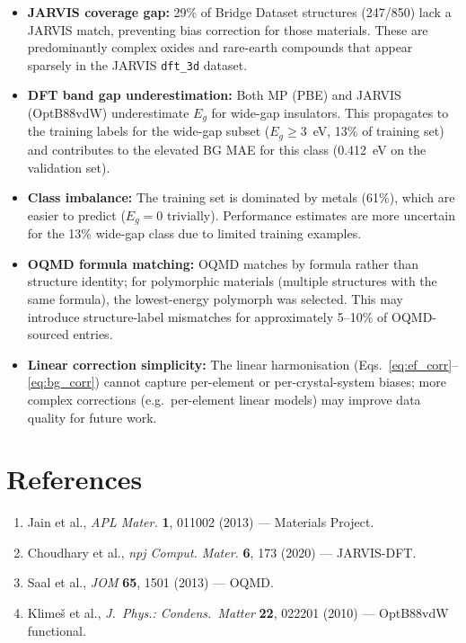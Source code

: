 \documentclass[10pt, a4paper]{article}
\begin{document}
\begin{itemize}
  \item \textbf{JARVIS coverage gap:} 29\% of Bridge Dataset structures
    (247/850) lack a JARVIS match, preventing bias correction for those
    materials. These are predominantly complex oxides and rare-earth
    compounds that appear sparsely in the JARVIS \texttt{dft\_3d} dataset.
  \item \textbf{DFT band gap underestimation:} Both MP (PBE) and
    JARVIS (OptB88vdW) underestimate $E_g$ for wide-gap insulators.
    This propagates to the training labels for the wide-gap subset
    ($E_g \geq 3$~eV, 13\% of training set) and contributes to the
    elevated BG MAE for this class (0.412~eV on the validation set).
  \item \textbf{Class imbalance:} The training set is dominated by
    metals (61\%), which are easier to predict ($E_g = 0$ trivially).
    Performance estimates are more uncertain for the 13\% wide-gap class
    due to limited training examples.
  \item \textbf{OQMD formula matching:} OQMD matches by formula rather
    than structure identity; for polymorphic materials (multiple
    structures with the same formula), the lowest-energy polymorph
    was selected. This may introduce structure-label mismatches for
    approximately 5--10\% of OQMD-sourced entries.
  \item \textbf{Linear correction simplicity:} The linear harmonisation
    (Eqs.~\ref{eq:ef_corr}--\ref{eq:bg_corr}) cannot capture
    per-element or per-crystal-system biases; more complex corrections
    (e.g.\ per-element linear models) may improve data quality for
    future work.
\end{itemize}

\section*{References}

\begin{enumerate}
  \item Jain et al., \textit{APL Mater.} \textbf{1}, 011002 (2013) —
    Materials Project.
  \item Choudhary et al., \textit{npj Comput. Mater.} \textbf{6}, 173 (2020)
    — JARVIS-DFT.
  \item Saal et al., \textit{JOM} \textbf{65}, 1501 (2013) — OQMD.
  \item Klimeš et al., \textit{J.\ Phys.: Condens.\ Matter} \textbf{22},
    022201 (2010) — OptB88vdW functional.
\end{enumerate}
\end{document}
